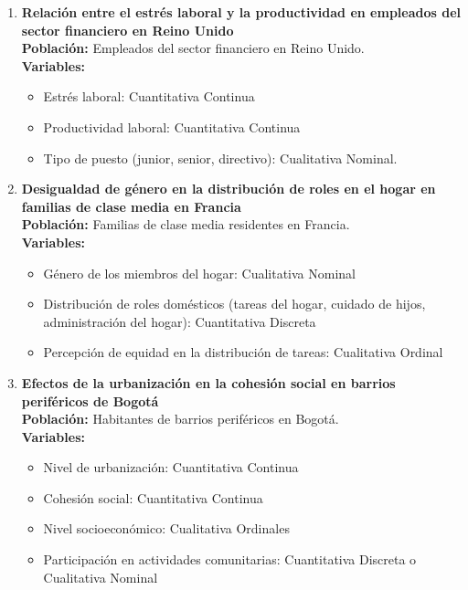\documentclass[12pt, letterpaper]{article}
\begin{document}
\begin{enumerate}
\item \textbf{Relación entre el estrés laboral y la productividad en empleados del sector financiero en Reino Unido} \\ 
\textbf{Población:} Empleados del sector financiero en Reino Unido. \\ 
\textbf{Variables:}
\begin{itemize}
  \item Estrés laboral: Cuantitativa Continua  
  \item Productividad laboral: Cuantitativa Continua
  \item Tipo de puesto (junior, senior, directivo): Cualitativa Nominal.
\end{itemize}

\item \textbf{Desigualdad de género en la distribución de roles en el hogar en familias de clase media en Francia} \\ 
\textbf{Población:} Familias de clase media residentes en Francia. \\ 
\textbf{Variables:}
\begin{itemize}
  \item Género de los miembros del hogar: Cualitativa Nominal   
  \item Distribución de roles domésticos (tareas del hogar, cuidado de hijos, administración del hogar): Cuantitativa Discreta
  \item Percepción de equidad en la distribución de tareas: Cualitativa Ordinal
\end{itemize}

\item \textbf{Efectos de la urbanización en la cohesión social en barrios periféricos de Bogotá} \\ 
\textbf{Población:} Habitantes de barrios periféricos en Bogotá. \\ 
\textbf{Variables:}
\begin{itemize}
  \item Nivel de urbanización: Cuantitativa Continua 
  \item Cohesión social: Cuantitativa Continua 
  \item Nivel socioeconómico: Cualitativa Ordinales
  \item Participación en actividades comunitarias: Cuantitativa Discreta o Cualitativa Nominal
\end{itemize}


\end{enumerate}
\end{document}
